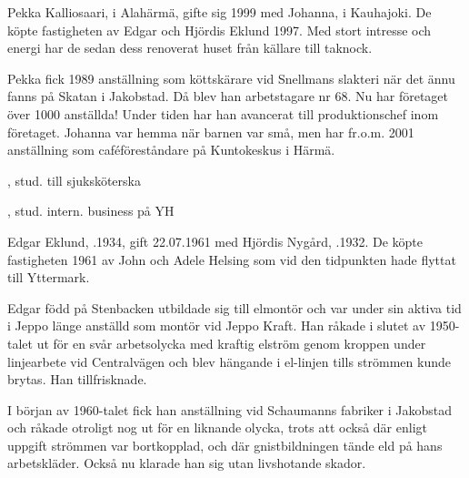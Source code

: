 %



%
Pekka Kalliosaari,  i Alahärmä, gifte sig 1999 med Johanna,  i Kauhajoki. De köpte fastigheten av Edgar och Hjördis Eklund 1997. Med stort intresse och energi har de sedan dess renoverat huset från källare till taknock.

Pekka fick 1989 anställning som köttskärare vid Snellmans slakteri när det ännu fanns på Skatan i Jakobstad. Då blev han arbetstagare nr 68. Nu har företaget över 1000 anställda! Under tiden har han avancerat till produktionschef inom företaget. Johanna var hemma när barnen var små, men har fr.o.m. 2001	anställning som caféföreståndare på Kuntokeskus i Härmä.
\begin{jhchildren}
  \item {}, stud. till sjuksköterska
  \item {}, stud. intern. business på YH
  \item {}
\end{jhchildren}


%
Edgar Eklund, .1934, gift 22.07.1961 med Hjördis Nygård, .1932. De köpte fastigheten 1961 av John och Adele Helsing som vid den tidpunkten hade flyttat till Yttermark.

Edgar född på Stenbacken utbildade sig till elmontör och var under sin aktiva tid i Jeppo länge anställd som montör vid Jeppo	Kraft. Han 	råkade i slutet av 1950-talet ut för en svår arbetsolycka med kraftig elström genom kroppen under linjearbete vid Centralvägen och blev 	hängande i el-linjen tills strömmen kunde brytas. Han tillfrisknade.

I början av 1960-talet fick han anställning vid Schaumanns fabriker i Jakobstad och råkade otroligt nog ut för en liknande olycka, trots att också där enligt uppgift strömmen var bortkopplad, och där gnistbildningen tände eld på hans arbetskläder. Också nu klarade han sig utan livshotande skador.

